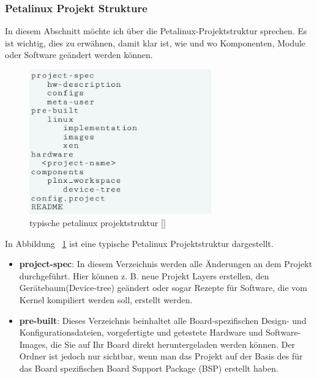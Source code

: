 \subsubsection{Petalinux Projekt Strukture}
In diesem Abschnitt möchte ich über die Petalinux-Projektstruktur sprechen. Es ist wichtig, dies zu erwähnen, damit klar ist, wie und wo Komponenten, Module oder Software geändert werden können.

\begin{figure}[h]
	\begin{center}
		\includegraphics[width=0.7\textwidth]{./images/petalinux-projektstruktur.jpg}
	\end{center}
	\vspace{-5pt}
	\caption[petalinux Projektstruktur]{typische petalinux projektstruktur [\cite{petailinuxtool}]} %
	\label{fig:petalinux:projektstruktur}
	\vspace{-5pt}
\end{figure}
In Abbildung ~\ref{fig:petalinux:projektstruktur} ist eine typische Petalinux Projektstruktur dargestellt. 

\begin{itemize}
	\item \textbf{project-spec}: In diesem Verzeichnis werden alle Änderungen an dem Projekt durchgeführt. Hier können z. B. neue Projekt Layers erstellen, den Gerätebaum(Device-tree) geändert oder sogar Rezepte für Software, die vom Kernel kompiliert werden soll, erstellt werden. 
	\item \textbf{pre-built}: Dieses Verzeichnis beinhaltet alle Board-spezifischen Design- und Konfigurationsdateien, vorgefertigte und getestete Hardware und Software-Images, die Sie auf Ihr Board direkt heruntergeladen werden können. Der Ordner ist jedoch nur sichtbar, wenn man das Projekt auf der Basis des für das Board spezifischen Board Support Package (BSP) erstellt haben. 
\end{itemize}
